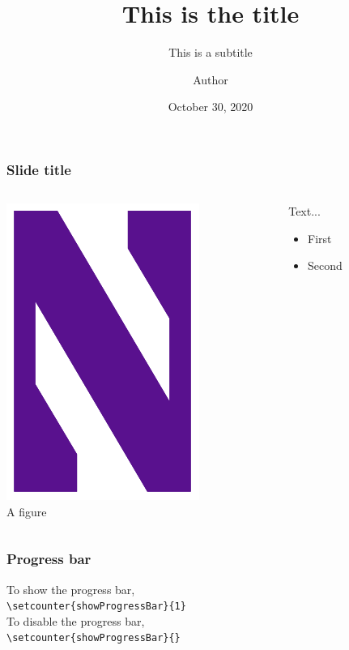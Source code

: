 \documentclass[xcolor=dvipsnames,aspectratio=169]{beamer}
\begin{document}
\title[Title]{This is the title}
\subtitle{This is a subtitle\\[1em]}
\author[AUTHOR]{Author}
\date {October 30, 2020}

\begin{frame}[plain]
  \titlepage
\end{frame}


\begin{frame}
  \frametitle{Slide title}
  \begin{columns}
    \begin{column}{0.4\textwidth}
      \begin{center}
        \includegraphics[width=.5\textwidth]{Northwestern_Wildcats_logo}\\
        A figure
      \end{center}
    \end{column}
    \begin{column}{0.65\textwidth}
      Text...
      \begin{itemize}
      \item First
      \item Second
      \end{itemize}
    \end{column}
  \end{columns}
\end{frame}


\begin{frame}[fragile]
  \frametitle{Progress bar}
  To show the progress bar,\\%
\verb!\setcounter{showProgressBar}{1}!\\[.5em]
  To disable the progress bar,\\%
\verb!\setcounter{showProgressBar}{}!
\end{frame}
\end{document}

